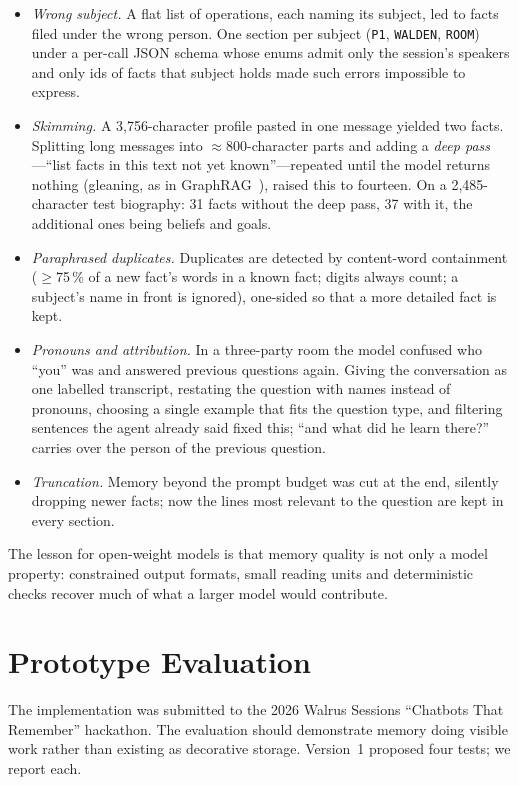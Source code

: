 \documentclass[11pt]{article}
\begin{document}
\begin{itemize}[nosep]
\item \emph{Wrong subject.} A flat list of operations, each naming its subject, led to facts filed under the wrong person. One section per subject (\texttt{P1}, \texttt{WALDEN}, \texttt{ROOM}) under a per-call JSON schema whose enums admit only the session's speakers and only ids of facts that subject holds made such errors impossible to express.
\item \emph{Skimming.} A 3,756-character profile pasted in one message yielded two facts. Splitting long messages into $\approx$800-character parts and adding a \emph{deep pass}---``list facts in this text not yet known''---repeated until the model returns nothing (gleaning, as in GraphRAG~\cite{graphrag}), raised this to fourteen. On a 2,485-character test biography: 31 facts without the deep pass, 37 with it, the additional ones being beliefs and goals.
\item \emph{Paraphrased duplicates.} Duplicates are detected by content-word containment ($\geq$75\,\% of a new fact's words in a known fact; digits always count; a subject's name in front is ignored), one-sided so that a more detailed fact is kept.
\item \emph{Pronouns and attribution.} In a three-party room the model confused who ``you'' was and answered previous questions again. Giving the conversation as one labelled transcript, restating the question with names instead of pronouns, choosing a single example that fits the question type, and filtering sentences the agent already said fixed this; ``and what did he learn there?'' carries over the person of the previous question.
\item \emph{Truncation.} Memory beyond the prompt budget was cut at the end, silently dropping newer facts; now the lines most relevant to the question are kept in every section.
\end{itemize}

The lesson for open-weight models is that memory quality is not only a model property: constrained output formats, small reading units and deterministic checks recover much of what a larger model would contribute.

\section{Prototype Evaluation}

The implementation was submitted to the 2026 Walrus Sessions ``Chatbots That Remember'' hackathon. The evaluation should demonstrate memory doing visible work rather than existing as decorative storage. Version~1 proposed four tests; we report each.
\end{document}
